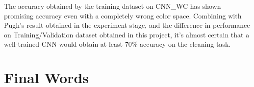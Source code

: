 \documentclass[bsc,logo,twoside,fullspacing,parskip]{infthesis}
\begin{document}
The accuracy obtained by the training dataset on CNN\_WC has shown promising accuracy even with a completely wrong color space. Combining with Pugh's result obtained in the experiment stage, and the difference in performance on Training/Validation dataset obtained in this project, it's almost certain that a well-trained CNN would obtain at least 70\% accuracy on the cleaning task. 

\section{Final Words}




\end{document}
